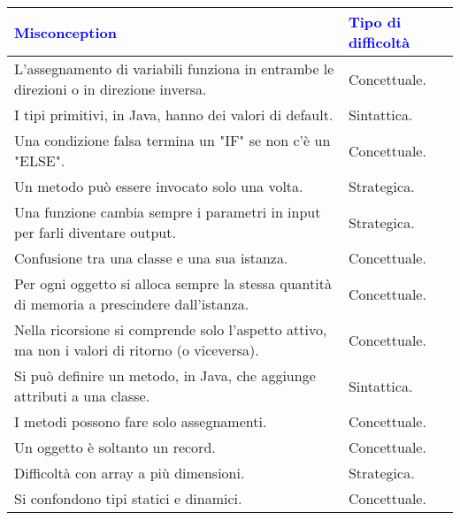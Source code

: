 \begin{center}
    \begin{tabular}{ || p{10.5cm} | p{5.5cm} ||}
    \hline\hline

    \textbf{\textcolor{blue}{Misconception}} & \textbf{\textcolor{blue}{Tipo di difficoltà}} \\ \hline
        
        L'assegnamento di variabili funziona in entrambe le direzioni o in direzione inversa. & Concettuale. \\\hline
        
        I tipi primitivi, in Java, hanno dei valori di default. & Sintattica. \\\hline
    
        Una condizione falsa termina un "IF" se non c'è un "ELSE". & Concettuale. \\\hline
    
        Un metodo può essere invocato solo una volta. & Strategica. \\\hline

        Una funzione cambia sempre i parametri in input per farli diventare output. & Strategica. \\\hline

        Confusione tra una classe e una sua istanza. & Concettuale. \\\hline

        Per ogni oggetto si alloca sempre la stessa quantità di memoria a prescindere dall'istanza. & Concettuale. \\\hline

        Nella ricorsione si comprende solo l'aspetto attivo, ma non i valori di ritorno
        (o viceversa). & Concettuale. \\\hline

        Si può definire un metodo, in Java, che aggiunge attributi a una classe. & Sintattica. \\\hline

        I metodi possono fare solo assegnamenti. & Concettuale. \\\hline

        Un oggetto è soltanto un record. & Concettuale. \\\hline

        Difficoltà con array a più dimensioni. & Strategica. \\\hline

        Si confondono tipi statici e dinamici. & Concettuale. \\\hline


\end{tabular}
\end{center}
